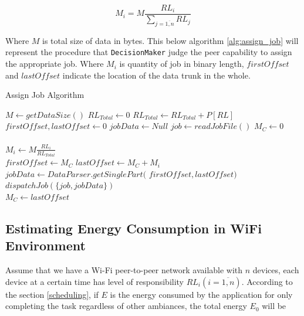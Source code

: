 \documentclass[conference]{IEEEtran}
\begin{document}
\begin{equation}
\label{eq:data_amount}
M_{i} = M\frac{RL_{i}}{\sum_{j = \overline{1,n}}{RL_{j}}}
\end{equation}

Where $M$ is total size of data in bytes. This below algorithm \ref{alg:assign_job} will represent the procedure that \texttt{DecisionMaker} judge the peer capability to assign the appropriate job. Where $M_{i}$ is quantity of job in binary length, $firstOffset$ and $lastOffset$ indicate the location of the data trunk in the whole.

\begin{algorithm}
\caption{Assign Job Algorithm}
\label{alg:assign_job}
\begin{algorithmic}[1]
\begin{footnotesize}
\State $M \leftarrow {getDataSize()}$
\State $RL_{Total} \leftarrow 0$ 
  \State $RL_{Total} \leftarrow RL_{Total} + P[RL]$
\EndFor
\\
\State $firstOffset, lastOffset \leftarrow 0$
\State $jobData \leftarrow Null$
\State $job \leftarrow {readJobFile()}$
\State $M_{C} \leftarrow 0$
\\
\\
  \State $M_{i} \leftarrow M\frac{RL_{i}}{RL_{Total}}$\\
  \State $firstOffset \leftarrow M_{C} $
  \State $lastOffset \leftarrow M_{C} + M_{i}$
  \State $jobData \leftarrow DataParser.getSinglePart($
  \State 
		\hspace{\algorithmicindent}
		\hspace{\algorithmicindent}
		\hspace{\algorithmicindent}
		\hspace{\algorithmicindent}
		\hspace{\algorithmicindent}
						$firstOffset, lastOffset)$
  \State $dispatchJob(\{job, jobData\})$\\
  \State $M_{C} \leftarrow lastOffset$
  
\EndFor

\EndFunction
\end{footnotesize}
\end{algorithmic}
\end{algorithm}

\subsection{Estimating Energy Consumption in WiFi Environment}
Assume that we have a Wi-Fi peer-to-peer network available with $n$ devices, each device at a certain time has level of responsibility $RL_{i} (i = \overline{1,n})$. According to the section \ref{scheduling}, if $E$ is the energy consumed by the application for only completing the task regardless of other ambiances, the total energy $E_{0}$ will be
\end{document}
